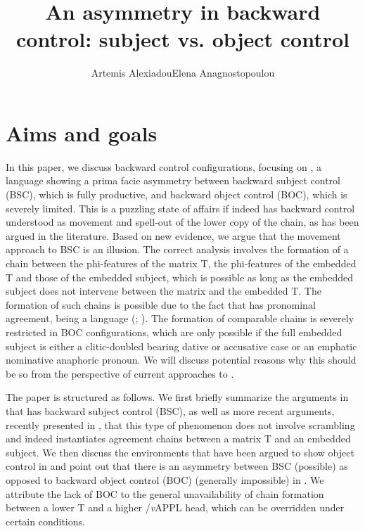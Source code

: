 \documentclass[output=paper]{langsci/langscibook}
\author{Artemis Alexiadou\affiliation{Humboldt-Universität zu Berlin\\Leibniz-Zentrum Allgemeine Sprachwissenschaft, Berlin}\lastand Elena Anagnostopoulou\affiliation{University of Crete}}
\title{An asymmetry in backward control: subject vs. object control}
\begin{document}
\citereset

 

\section{Aims and goals}

In this paper, we discuss backward control configurations, focusing on , a language showing a prima facie asymmetry between backward subject control (BSC), which is fully productive, and backward object control (BOC), which is severely limited. This is a puzzling state of affairs if  indeed has backward control understood as movement and spell-out of the lower copy of the chain, as has been argued in the literature. Based on new evidence, we argue that the movement approach to  BSC is an illusion. The correct analysis involves the formation of a chain between the phi-features of the matrix T, the phi-features of the embedded T and those of the embedded subject, which is possible as long as the embedded subject does not intervene between the matrix and the embedded T. The formation of such chains is possible due to the fact that  has pronominal agreement, being a  language (\citealt{Alexiadou1998}; \citealt{Barbosa2009}). The formation of comparable chains is severely restricted in BOC configurations, which are only possible if the full embedded subject is either a clitic-doubled  bearing dative or accusative case or an emphatic nominative anaphoric pronoun. We will discuss potential reasons why this should be so from the perspective of current approaches to .

The paper is structured as follows. We first briefly summarize the arguments in \citet{Alexiadou2010} that  has backward subject control (BSC), as well as more recent arguments, recently presented in \citet{Tsakali2017}, that this type of phenomenon does not involve scrambling and indeed instantiates agreement chains between a matrix T and an embedded subject. We then discuss the environments that have been argued to show object control in  and point out that there is an asymmetry between BSC (possible) as opposed to backward object control (BOC) (generally impossible) in . We attribute the lack of BOC to the general unavailability of chain formation between a lower T and a higher \slash \textit{v}APPL head, which can be overridden under certain conditions.
\end{document}
